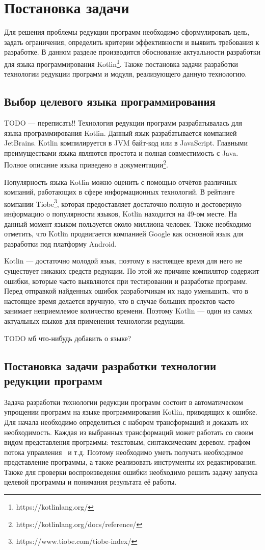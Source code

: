 \chapter{Постановка задачи}
Для решения проблемы редукции программ необходимо сформулировать цель, задать ограничения, определить критерии эффективности и выявить требования к разработке. В данном разделе производится обоснование актуальности разработки для языка программирования Kotlin\footnote{https://kotlinlang.org/}. Также постановка задачи разработки технологии редукции программ и модуля, реализующего данную технологию.

\section{Выбор целевого языка программирования}
TODO --- переписать!!
Технология редукции программ разрабатывалась для языка программирования Kotlin. Данный язык разрабатывается компанией JetBrains. Kotlin компилируется в JVM байт-код или в JavaScript. Главными преимуществами языка являются простота и полная совместимость с Java. Полное описание языка приведено в документации\footnote{https://kotlinlang.org/docs/reference/}.

Популярность языка Kotlin можно оценить с помощью отчётов раз­личных компаний, работающих в сфере информационных технологий. В рейтинге компании Tiobe\footnote{https://www.tiobe.com/tiobe-index/}, которая предоставляет достаточно полную и достоверную информацию о популярности языков, Kotlin находится на 49-ом месте. На данный момент языком пользуется около миллиона человек. Также необходимо отметить, что Kotlin продвигается компанией Google как основной язык для разработки под платформу Android. 

Kotlin --- достаточно молодой язык, поэтому в настоящее время для него не существует никаких средств редукции. По этой же причине компилятор содержит ошибки, которые часто выявляются при тестировании и разработке программ. Перед отправкой найденных ошибок разработчикам их надо уменьшить, что в настоящее время делается вручную, что в случае больших проектов часто занимает неприемлемое количество времени. Поэтому Kotlin --- один из самых актуальных языков для применения технологии редукции.

TODO мб что-нибудь добавить о языке?
\section{Постановка задачи разработки технологии редукции программ}
Задача разработки технологии редукции программ состоит в автоматическом упрощении программ на языке программирования Kotlin, приводящих к ошибке. Для начала необходимо определиться с набором трансформаций и доказать их необходимость. Каждая из выбранных трансформаций может работать со своим видом представления программы: текстовым, синтаксическим деревом, графом потока управления~\cite{harrold2005representation} и т.д. Поэтому необходимо уметь получать необходимое представление программы, а также реализовать инструменты их редактирования. Также для проверки воспроизведения ошибки необходимо решить задачу запуска целевой программы и понимания результата её работы.

